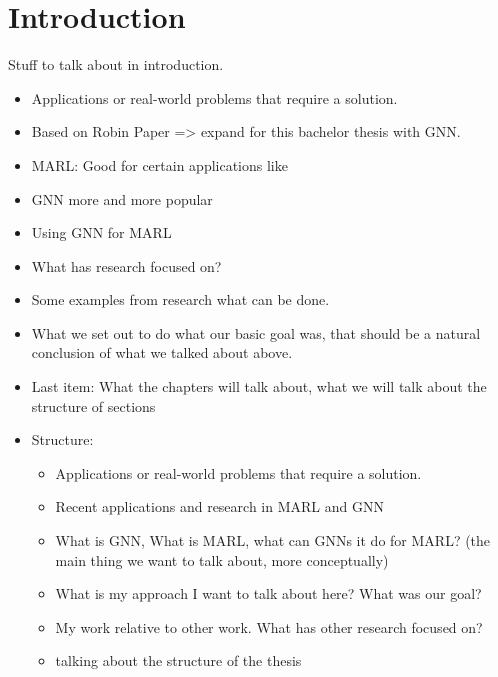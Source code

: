 
\chapter{Introduction}
Stuff to talk about in introduction.
\begin{itemize}[noitemsep,nolistsep]
	\item Applications or real-world problems that require a solution. 
	\item Based on Robin Paper => expand for this bachelor thesis with GNN.
	\item MARL: Good for certain applications like
	\item GNN more and more popular
	\item Using GNN for MARL
	\item What has research focused on?
	\item Some examples from research what can be done.
	\item What we set out to do what our basic goal was, that should be a natural conclusion of what we talked about above.
	\item Last item: What the chapters will talk about, what we will talk about the structure of sections
	\item Structure:
	\begin{itemize}[noitemsep,nolistsep]
		\item Applications or real-world problems that require a solution. 
		\item Recent applications and research in MARL and GNN
		\item What is GNN, What is MARL, what can GNNs it do for MARL? (the main thing we want to talk about, more conceptually)
		\item What is my approach I want to talk about here? What was our goal?
		\item My work relative to other work. What has other research focused on?
		\item talking about the structure of the thesis
	\end{itemize}
\end{itemize}